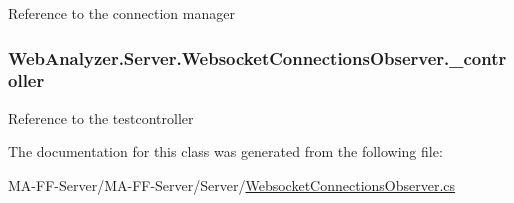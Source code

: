 Reference to the connection manager 

\hypertarget{class_web_analyzer_1_1_server_1_1_websocket_connections_observer_ac4ce45307e4d81fc6902369aacd6fb0f}{}
\subsubsection[{\+\_\+controller}]{ Web\+Analyzer.\+Server.\+Websocket\+Connections\+Observer.\+\_\+controller\hspace{0.3cm}{\ttfamily [private]}}\label{class_web_analyzer_1_1_server_1_1_websocket_connections_observer_ac4ce45307e4d81fc6902369aacd6fb0f}


Reference to the testcontroller 



The documentation for this class was generated from the following file\+:\begin{DoxyCompactItemize}
\item 
M\+A-\/\+F\+F-\/\+Server/\+M\+A-\/\+F\+F-\/\+Server/\+Server/\hyperlink{_websocket_connections_observer_8cs}{Websocket\+Connections\+Observer.\+cs}\end{DoxyCompactItemize}
